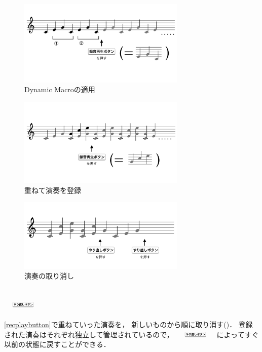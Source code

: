 \begin{figure}[tb]
\includegraphics[width=8cm,bb=0 0 1038 532]{images/rp2.png}
\centering
\caption{Dynamic Macroの適用}
\label{recplay2}
\end{figure}

\begin{figure}[tb]
\includegraphics[width=8cm,bb=0 0 1026 544]{images/rp3.png}
\centering
\caption{重ねて演奏を登録}
\label{recplay3}
\end{figure}

\begin{figure}[tb]
\includegraphics[width=8cm,bb=0 0 1010 440]{images/rp4.png}
\centering
\caption{演奏の取り消し}
\label{recplay4}
\end{figure}

\subsection{\protect\includegraphics[height=3mm,width=20mm,bb=3 23 360 80]{images/undobutton.png}}

\ref{recplaybutton}で重ねていった演奏を，
新しいものから順に取り消す()．
登録された演奏はそれぞれ独立して管理されているので，
\includegraphics[height=3mm,width=20mm,bb=3 23 360 80]{images/undobutton.png}
によってすぐ以前の状態に戻すことができる．
